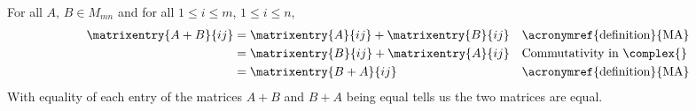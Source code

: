 For all $A,\,B\in M_{mn}$ and for all $1\leq i\leq m$,  $1\leq i\leq n$,
%
\begin{align*}
\matrixentry{A+B}{ij}
&=\matrixentry{A}{ij}+\matrixentry{B}{ij}
&&\text{\acronymref{definition}{MA}}\\
%
&=\matrixentry{B}{ij}+\matrixentry{A}{ij}
&&\text{Commutativity in $\complex{\null}$}\\
%
&=\matrixentry{B+A}{ij}
&&\text{\acronymref{definition}{MA}}
\end{align*}
%
With equality of each entry of the matrices $A+B$ and $B+A$ being equal  tells us the two matrices are equal.

